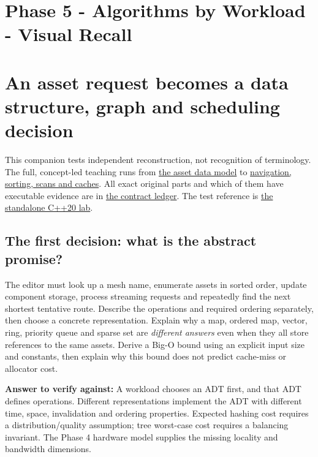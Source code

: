 \hypertarget{appendix-8a046b38375e}{}
\section*{Phase 5 - Algorithms by Workload - Visual Recall}
\section{An asset request becomes a data structure, graph and scheduling decision}\label{appendix-8a046b38375e-an-asset-request-becomes-a-data-structure-graph-and-scheduling-decision}

This companion tests independent reconstruction, not recognition of terminology. The full, concept-led teaching runs from \hyperref[01-foundations-i-ch007-the-scene-is-now-too-large-for-the-wrong-container-phase-5-m025m027-parts-401445]{the asset data model} to \hyperref[01-foundations-i-ch008-from-an-asset-map-to-a-correct-navigable-world-phase-5-m028m030-parts-446500]{navigation, sorting, scans and caches}. All exact original parts and which of them have executable evidence are in \hyperref[appendix-fd090d982a15-phase-5-algorithms-and-data-structure-workload-contracts-parts-401500]{the contract ledger}. The test reference is \hyperref[source-file-0ec69e1a1a11439bca29faa5]{the standalone C++20 lab}.

\subsection{The first decision: what is the abstract promise?}\label{appendix-8a046b38375e-the-first-decision-what-is-the-abstract-promise}

The editor must look up a mesh name, enumerate assets in sorted order, update component storage, process streaming requests and repeatedly find the next shortest tentative route. Describe the operations and required ordering separately, then choose a concrete representation. Explain why a map, ordered map, vector, ring, priority queue and sparse set are \emph{different answers} even when they all store references to the same assets. Derive a Big-O bound using an explicit input size and constants, then explain why this bound does not predict cache-miss or allocator cost.

\textbf{Answer to verify against:} A workload chooses an ADT first, and that ADT defines operations. Different representations implement the ADT with different time, space, invalidation and ordering properties. Expected hashing cost requires a distribution/quality assumption; tree worst-case cost requires a balancing invariant. The Phase 4 hardware model supplies the missing locality and bandwidth dimensions.

